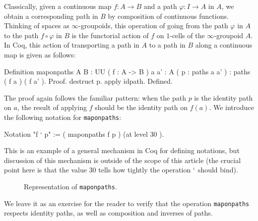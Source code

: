 Classically, given a continuous map $f:A\to B$ and a path
$\varphi:I\to A$ in $A$, we obtain a corresponding path in $B$ by
composition of continuous functions.  Thinking of spaces as
$\infty$-groupoids, this operation of going from the path $\varphi$ in
$A$ to the path $f\circ\varphi$ in $B$ is the functorial action of $f$
on $1$-cells of the $\infty$-groupoid $A$.  In Coq, this action of
transporting a path in $A$ to a path in $B$ along a continuous map is
given as follows:
\begin{center}
  \begin{coqcode}
Definition maponpaths { A B : UU } ( f : A -> B ) { a a' : A } ( p : paths a a' ) : paths ( f a ) ( f a' ).
Proof.
  destruct p. apply idpath. 
Defined.
  \end{coqcode}
\end{center}
The proof again follows the familiar pattern: when the path $p$ is the
identity path on $a$, the result of applying $f$ should be the
identity path on $f(a)$.  We introduce the following notation for
\verb|maponpaths|:
\begin{center}
  \begin{coqcode}
Notation "f ` p" := ( maponpaths f p ) (at level 30 ).
  \end{coqcode}
\end{center}
This is an example of a general mechanism in Coq for defining
notations, but discussion of this mechanism is outside of the scope of
this article (the crucial point here is that the value 30 tells how
tightly the operation $`$ should bind).
\begin{figure}[H]
  \centering
  \caption{Representation of \texttt{maponpaths}.}
\end{figure}
We leave it as an exercise for the reader to verify that the
operation \verb|maponpaths| respects identity paths, as well as
composition and inverses of paths.

